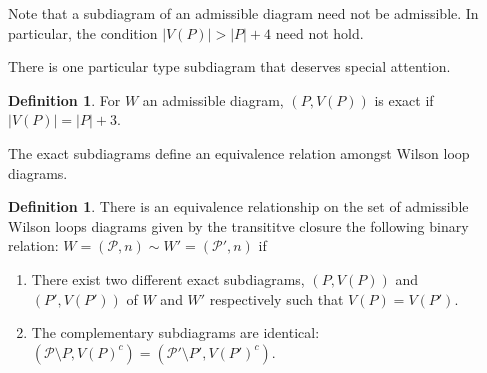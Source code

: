 \documentclass[11pt]{article}
\newcommand{\cP}{\mathcal{P}}
\theoremstyle{remark}
\theoremstyle{definition}
\newtheorem{dfn}[thm]{Definition}
\begin{document}
Note that a subdiagram of an admissible diagram need not be admissible. In particular, the condition $|V(P)| > |P| +4$ need not hold.

There is one particular type subdiagram that deserves special attention.

\begin{dfn}
For $W$ an admissible diagram, $(P, V(P))$ is exact if $|V(P)| = |P| + 3$.
\end{dfn}

The exact subdiagrams define an equivalence relation amongst Wilson loop diagrams.

\begin{dfn}\label{equivdfn} 
There is an equivalence relationship on the set of admissible Wilson loops diagrams given by the transititve closure the following binary relation: $W = (\cP, n) \sim W'= (\cP', n)$ if
\begin{enumerate}
\item There exist two different exact subdiagrams, $(P, V(P))$ and $(P', V(P'))$ of $W$ and $W'$ respectively such that $V(P) =  V(P')$.
\item The complementary subdiagrams are identical: $(\cP \setminus P, V(P)^c) = (\cP' \setminus P', V(P')^c)$.
\end{enumerate}
\end{dfn}
\end{document}

